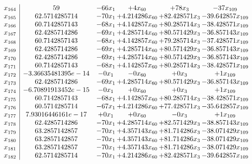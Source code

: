 \documentclass[11pt]{article}
\begin{document}
\[\begin{array}{c| c c@{\hskip 2pt} c@{\hskip 2pt} c@{\hskip 2pt} c@{\hskip 2pt} }
 x_{164}   &  59 & -66 x_{1} & + 4 x_{60} & + 78 x_{3} & -37 x_{109}\\
 x_{165}   &  62.5714285714 & -70 x_{1} & + 4.214286 x_{60} & + 82.428571 x_{3} & -39.642857 x_{109}\\
 x_{166}   &  60.7142857143 & -68 x_{1} & + 4.142857 x_{60} & + 80.285714 x_{3} & -38.428571 x_{109}\\
 x_{167}   &  62.4285714286 & -69 x_{1} & + 4.285714 x_{60} & + 80.571429 x_{3} & -36.857143 x_{109}\\
 x_{168}   &  60.7142857143 & -68 x_{1} & + 4.142857 x_{60} & + 79.285714 x_{3} & -37.428571 x_{109}\\
 x_{169}   &  62.4285714286 & -69 x_{1} & + 4.285714 x_{60} & + 80.571429 x_{3} & -36.857143 x_{109}\\
 x_{170}   &  62.4285714286 & -69 x_{1} & + 4.285714 x_{60} & + 80.571429 x_{3} & -36.857143 x_{109}\\
 x_{171}   &  60.7142857143 & -68 x_{1} & + 4.142857 x_{60} & + 80.285714 x_{3} & -38.428571 x_{109}\\
 x_{172}   &  -3.36635481395e-14 & -0 x_{1} & -0 x_{60} & + 0 x_{3} & + 1 x_{109}\\
 x_{173}   &  62.4285714286 & -69 x_{1} & + 4.285714 x_{60} & + 80.571429 x_{3} & -36.857143 x_{109}\\
 x_{174}   &  -6.70891913452e-15 & -0 x_{1} & + 0 x_{60} & + 0 x_{3} & + 1 x_{109}\\
 x_{175}   &  60.7142857143 & -68 x_{1} & + 4.142857 x_{60} & + 80.285714 x_{3} & -38.428571 x_{109}\\
 x_{176}   &  60.5714285714 & -67 x_{1} & + 4.214286 x_{60} & + 77.428571 x_{3} & -35.642857 x_{109}\\
 x_{177}   &  7.93016446161e-17 & + 0 x_{1} & + 0 x_{60} & -0 x_{3} & + 1 x_{109}\\
 x_{178}   &  62.4285714286 & -70 x_{1} & + 4.285714 x_{60} & + 82.571429 x_{3} & -38.857143 x_{109}\\
 x_{179}   &  63.2857142857 & -70 x_{1} & + 4.357143 x_{60} & + 81.714286 x_{3} & -38.071429 x_{109}\\
 x_{180}   &  63.2857142857 & -70 x_{1} & + 4.357143 x_{60} & + 81.714286 x_{3} & -38.071429 x_{109}\\
 x_{181}   &  63.2857142857 & -70 x_{1} & + 4.357143 x_{60} & + 81.714286 x_{3} & -38.071429 x_{109}\\
 x_{182}   &  62.5714285714 & -70 x_{1} & + 4.214286 x_{60} & + 82.428571 x_{3} & -39.642857 x_{109}\\

\end{array}\]
\end{document}
